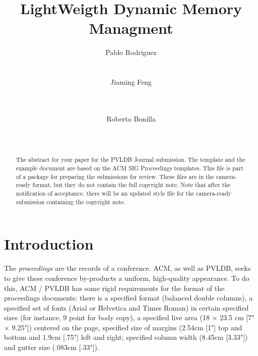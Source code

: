 \documentclass{vldb}
\begin{document}

\title{LightWeigth Dynamic Memory Managment}



\author{
\alignauthor
Pablo Rodriguez\\
       \\
       \\
\alignauthor
Jiaming Feng\\
       \\
       \\
\and
\alignauthor Roberto Bonilla\\
       \\
       \\
}




\maketitle

\begin{abstract}
The abstract for your paper for the PVLDB Journal submission.
The template and the example document are based on the ACM SIG Proceedings  templates. This file is part of a package for preparing the submissions for review. These files are in the camera-ready format, but they do not contain the full copyright note.
Note that after the notification of acceptance, there will be an updated style file for the camera-ready submission containing the copyright note.
\end{abstract}



\section{Introduction}
The \textit{proceedings} are the records of a conference.
ACM, as well as PVLDB, seeks to give these conference by-products a uniform,
high-quality appearance.  To do this, ACM / PVLDB has some rigid
requirements for the format of the proceedings documents: there
is a specified format (balanced  double columns), a specified
set of fonts (Arial or Helvetica and Times Roman) in
certain specified sizes (for instance, 9 point for body copy),
a specified live area (18 $\times$ 23.5 cm [7" $\times$ 9.25"]) centered on
the page, specified size of margins (2.54cm [1"] top and
bottom and 1.9cm [.75"] left and right; specified column width
(8.45cm [3.33"]) and gutter size (.083cm [.33"]).
\end{document}
